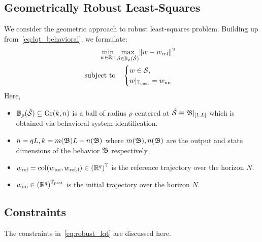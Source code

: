 \subsection{Geometrically Robust Least-Squares}
We consider the geometric approach to robust least-squares problem. Building up from~\eqref{eq:lqt_behavioral}, we formulate:
\begin{equation}\label{eq:robust_lqt}
    \begin{split}
    \min_{w \in \mathbb{R}^n} & \max_{\mathcal{S} \in \mathbb{B}_{\rho}(\hat{\mathcal{S}})} \lVert w - w_{\textrm{ref}} \rVert^2 \\
    \text{subject to} & \quad \begin{cases} w \in \mathcal{S},\\
          w|_{\mathbb{T}_{\textrm{past}}} = w_{\textrm{ini}} \end{cases}
    \end{split}
\end{equation}
Here, 
\begin{itemize}
    \item $\mathbb{B}_{\rho}(\hat{\mathcal{S}}) \subseteq \text{Gr}(k,n)$ is a ball of radius $\rho$ centered at $\hat{\mathcal{S}} \equiv \mathfrak{B}|_{[1,L]}$ which is obtained via behavioral system identification.
    \item $n = qL, k = m(\mathfrak{B})L+n(\mathfrak{B})$ where $m(\mathfrak{B}), n(\mathfrak{B})$ are the output and state dimensions of the behavior $\mathfrak{B}$ respectively.
    \item $w_{\textrm{ref}} = \textrm{col}(w_{\textrm{ini}}, w_{\textrm{ref,f}}) \in {(\mathbb{R}^q)}^{\mathbb{T}}$ is the reference trajectory over the horizon $N$.
    \item $w_{\textrm{ini}} \in {(\mathbb{R}^q)}^{\mathbb{T}_{\textrm{past}}}$ is the initial trajectory over the horizon $N$.
\end{itemize}

\subsection{Constraints}
The constraints in~\eqref{eq:robust_lqt} are discussed here.

